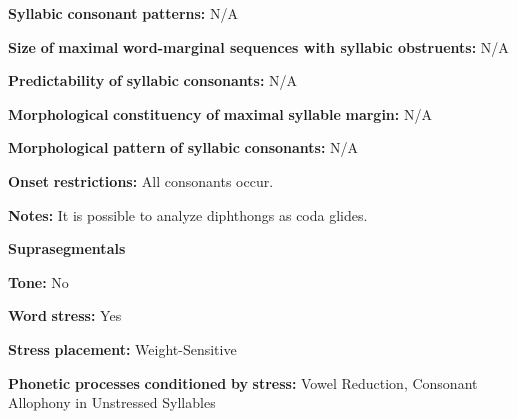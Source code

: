 \begin{styleBody}
\textbf{Syllabic} \textbf{consonant} \textbf{patterns:} N/A
\end{styleBody}

\begin{styleBody}
\textbf{Size} \textbf{of} \textbf{maximal} \textbf{word{}-marginal sequences with syllabic obstruents:}  N/A
\end{styleBody}

\begin{styleBody}
\textbf{Predictability} \textbf{of} \textbf{syllabic} \textbf{consonants:} N/A
\end{styleBody}

\begin{styleBody}
\textbf{Morphological} \textbf{constituency} \textbf{of} \textbf{maximal} \textbf{syllable} \textbf{margin:} N/A
\end{styleBody}

\begin{styleBody}
\textbf{Morphological} \textbf{pattern} \textbf{of} \textbf{syllabic} \textbf{consonants:} N/A
\end{styleBody}

\begin{styleBody}
\textbf{Onset} \textbf{restrictions:} All consonants occur.
\end{styleBody}

\begin{styleBody}
\textbf{Notes:} It is possible to analyze diphthongs as coda glides.
\end{styleBody}

\begin{styleBody}
\textbf{Suprasegmentals}
\end{styleBody}

\begin{styleBody}
\textbf{Tone:} No
\end{styleBody}

\begin{styleBody}
\textbf{Word} \textbf{stress:} Yes
\end{styleBody}

\begin{styleBody}
\textbf{Stress} \textbf{placement:} Weight-Sensitive
\end{styleBody}

\begin{styleBody}
\textbf{Phonetic} \textbf{processes} \textbf{conditioned} \textbf{by} \textbf{stress:} Vowel Reduction, Consonant Allophony in Unstressed Syllables
\end{styleBody}

